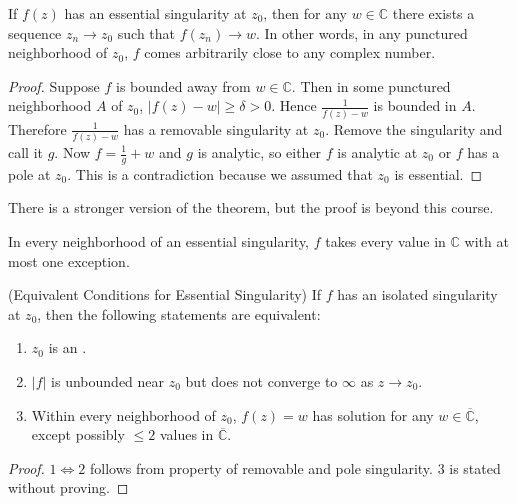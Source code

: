 \begin{theorem}
	If  $f(z)$ has an essential singularity at $z_0$, then for any $w \in \mathbb{C}$ there exists a sequence $z_n \to  z_0$ such that $f(z_n) \to  w$. In other words, in any punctured neighborhood of  $z_0$, $f$ comes arbitrarily close to any complex number.
\end{theorem}
\begin{proof}
	Suppose $f$ is bounded away from $w \in \mathbb{C}$. Then in some punctured neighborhood $A$ of $z_0$, $\left| f(z) - w \right| \ge \delta>0$. Hence $\frac{1}{f(z) - w}$ is bounded in $A$. Therefore $\frac{1}{f(z) - w}$ has a removable singularity at $z_0$. Remove the singularity and call it $g$. Now $f = \frac{1}{g} + w$ and $g$ is analytic, so either $f$ is analytic at $z_0$ or $f$ has a pole at $z_0$. This is a contradiction because we assumed that $z_0$ is essential.
\end{proof}

There is a stronger version of the theorem, but the proof is beyond this course.
\begin{theorem}
	In every neighborhood of an essential singularity, $f$ takes every value in $\mathbb{C} $ with at most one exception.
\end{theorem}


\begin{theorem}(Equivalent Conditions for Essential Singularity)
	If $f$ has an isolated singularity at $z_0$, then the following statements are equivalent:
	\begin{enumerate}
		\item $z_0$ is an .
		\item $|f|$ is unbounded near $z_0$ but does not converge to $\infty $ as $z \to  z_0$.
		\item Within every neighborhood of $z_0$, $f(z) = w$ has solution for any $w \in \overline{\mathbb{C}} $, except possibly $\le 2$ values in $\overline{\mathbb{C}} $.
	\end{enumerate}
\end{theorem}
\begin{proof}
	$1 \iff  2$ follows from property of removable and pole singularity. $3$ is stated without proving.
\end{proof}


